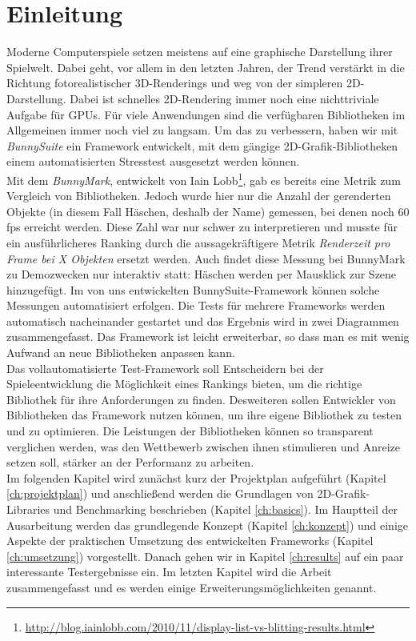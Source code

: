 \chapter{Einleitung}
Moderne Computerspiele setzen meistens auf eine graphische Darstellung ihrer Spielwelt. Dabei geht, vor allem in den letzten Jahren, der Trend verstärkt in die Richtung fotorealistischer 3D-Renderings und weg von der simpleren 2D-Darstellung.
Dabei ist schnelles 2D-Rendering immer noch eine nichttriviale Aufgabe für GPUs. Für viele Anwendungen sind die verfügbaren Bibliotheken im Allgemeinen immer noch viel zu langsam. Um das zu verbessern, haben wir mit \textit{BunnySuite} ein Framework entwickelt, mit dem gängige 2D-Grafik-Bibliotheken einem automatisierten Stresstest ausgesetzt werden können.\\
Mit dem \textit{BunnyMark}, entwickelt von Iain Lobb\footnote{\url{http://blog.iainlobb.com/2010/11/display-list-vs-blitting-results.html}}, gab es bereits eine Metrik zum Vergleich von Bibliotheken. Jedoch wurde hier nur die Anzahl der gerenderten Objekte (in diesem Fall Häschen, deshalb der Name) gemessen, bei denen noch 60 fps erreicht werden. Diese Zahl war nur schwer zu interpretieren und musste für ein ausführlicheres Ranking durch die aussagekräftigere Metrik  \textit{Renderzeit pro Frame bei X Objekten} ersetzt werden. Auch findet diese Messung bei BunnyMark zu Demozwecken nur interaktiv statt: Häschen werden per Mausklick zur Szene hinzugefügt. Im von uns entwickelten BunnySuite-Framework können solche Messungen automatisiert erfolgen. Die Tests für mehrere Frameworks werden automatisch nacheinander gestartet und das Ergebnis wird in zwei Diagrammen zusammengefasst. Das Framework ist leicht erweiterbar, so dass man es mit wenig Aufwand an neue Bibliotheken anpassen kann.\\
Das vollautomatisierte Test-Framework soll Entscheidern bei der Spieleentwicklung die Möglichkeit eines Rankings bieten, um die richtige Bibliothek für ihre Anforderungen zu finden. Desweiteren sollen Entwickler von Bibliotheken das Framework nutzen können, um ihre eigene Bibliothek zu testen und zu optimieren. Die Leistungen der Bibliotheken können so transparent verglichen werden, was den Wettbewerb zwischen ihnen stimulieren und Anreize setzen soll, stärker an der Performanz zu arbeiten.\\
Im folgenden Kapitel wird zunächst kurz der Projektplan aufgeführt (Kapitel \ref{ch:projektplan}) und anschließend werden die Grundlagen von 2D-Grafik-Libraries und Benchmarking beschrieben (Kapitel \ref{ch:basics}). Im Hauptteil der Ausarbeitung werden das grundlegende Konzept (Kapitel \ref{ch:konzept}) und einige Aspekte der praktischen Umsetzung des entwickelten Frameworks (Kapitel \ref{ch:umsetzung}) vorgestellt. Danach gehen wir in Kapitel \ref{ch:results} auf ein paar interessante Testergebnisse ein. Im letzten Kapitel wird die Arbeit zusammengefasst und es werden einige Erweiterungsmöglichkeiten genannt.

